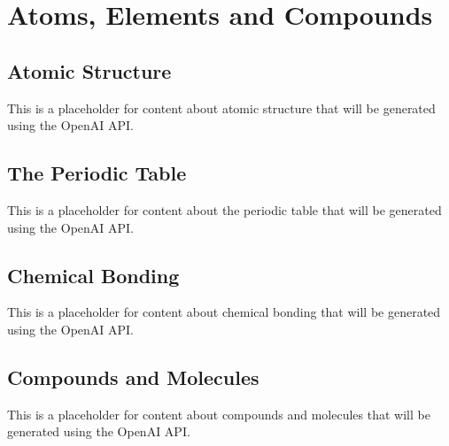 \chapter{Atoms, Elements and Compounds}


\section{Atomic Structure}

This is a placeholder for content about atomic structure that will be generated using the OpenAI API.

\section{The Periodic Table}

This is a placeholder for content about the periodic table that will be generated using the OpenAI API.

\section{Chemical Bonding}

This is a placeholder for content about chemical bonding that will be generated using the OpenAI API.

\section{Compounds and Molecules}

This is a placeholder for content about compounds and molecules that will be generated using the OpenAI API.